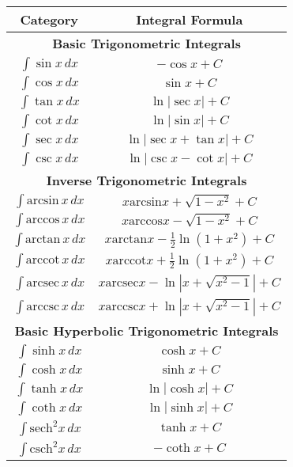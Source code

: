 \begin{table}[h]
    \centering
    \renewcommand{\arraystretch}{1.5}
    \begin{tabular}{|c|c|}
        \hline
        \textbf{Category} & \textbf{Integral Formula} \\
        \hline
        \multicolumn{2}{|c|}{\textbf{Basic Trigonometric Integrals}} \\
        \hline
        $\int \sin x \,dx$ & $-\cos x + C$ \\
        $\int \cos x \,dx$ & $\sin x + C$ \\
        $\int \tan x \,dx$ & $\ln |\sec x| + C$ \\
        $\int \cot x \,dx$ & $\ln |\sin x| + C$ \\
        $\int \sec x \,dx$ & $\ln |\sec x + \tan x| + C$ \\
        $\int \csc x \,dx$ & $\ln |\csc x - \cot x| + C$ \\
        \hline
        \multicolumn{2}{|c|}{\textbf{Inverse Trigonometric Integrals}} \\
        \hline
        $\int \text{arcsin} \,x \,dx$ & $x \text{arcsin} x + \sqrt{1 - x^2} + C$ \\
        $\int \text{arccos} \,x \,dx$ & $x \text{arccos} x - \sqrt{1 - x^2} + C$ \\
        $\int \text{arctan} \,x \,dx$ & $x \text{arctan} x - \frac{1}{2} \ln(1 + x^2) + C$ \\
        $\int \text{arccot} \,x \,dx$ & $x \text{arccot} x + \frac{1}{2} \ln(1 + x^2) + C$ \\
        $\int \text{arcsec} \,x \,dx$ & $x \text{arcsec} x - \ln |x + \sqrt{x^2 - 1}| + C$ \\
        $\int \text{arccsc} \,x \,dx$ & $x \text{arccsc} x + \ln |x + \sqrt{x^2 - 1}| + C$ \\
        \hline
        \multicolumn{2}{|c|}{\textbf{Basic Hyperbolic Trigonometric Integrals}} \\
        \hline
        $\int \sinh x \,dx$ & $\cosh x + C$ \\
        $\int \cosh x \,dx$ & $\sinh x + C$ \\
        $\int \tanh x \,dx$ & $\ln |\cosh x| + C$ \\
        $\int \coth x \,dx$ & $\ln |\sinh x| + C$ \\
        $\int \text{sech}^2 x \,dx$ & $\tanh x + C$ \\
        $\int \text{csch}^2 x \,dx$ & $-\coth x + C$ \\

\end{tabular}
\end{table}
